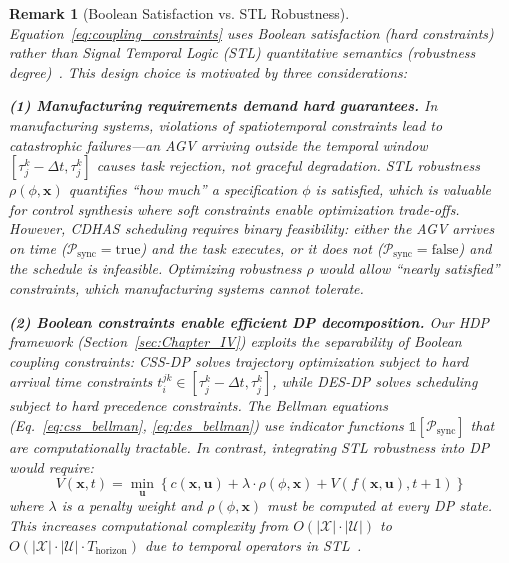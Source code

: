 \documentclass[manuscript,screen,review]{acmart}
\newtheorem{remark}{Remark}
\begin{document}
\begin{remark}[Boolean Satisfaction vs. STL Robustness]
\label{rem:stl_semantics}
Equation~\eqref{eq:coupling_constraints} uses \textit{Boolean satisfaction} 
(hard constraints) rather than Signal Temporal Logic (STL) \textit{quantitative 
semantics} (robustness degree)~\cite{melani2025tree}. 
This design choice is motivated by three considerations:

\textbf{(1) Manufacturing requirements demand hard guarantees.} In manufacturing 
systems, violations of spatiotemporal constraints lead to \textit{catastrophic 
failures}—an AGV arriving outside the temporal window $[\tau_j^k - \Delta t, \tau_j^k]$ 
causes task rejection, not graceful degradation. STL robustness $\rho(\phi, \mathbf{x})$ 
quantifies ``how much'' a specification $\phi$ is satisfied, 
which is valuable for control synthesis where soft constraints enable 
optimization trade-offs. However, CDHAS scheduling requires \textit{binary 
feasibility}: either the AGV arrives on time ($\mathcal{P}_{\text{sync}} = \text{true}$) 
and the task executes, or it does not ($\mathcal{P}_{\text{sync}} = \text{false}$) 
and the schedule is infeasible. Optimizing robustness $\rho$ would allow 
``nearly satisfied'' constraints, which manufacturing systems cannot tolerate.

\textbf{(2) Boolean constraints enable efficient DP decomposition.} Our HDP 
framework (Section~\ref{sec:Chapter_IV}) exploits the \textit{separability} of 
Boolean coupling constraints: CSS-DP solves trajectory optimization subject to 
hard arrival time constraints $t_i^{jk} \in [\tau_j^k - \Delta t, \tau_j^k]$, 
while DES-DP solves scheduling subject to hard precedence constraints. The 
Bellman equations (Eq.~\ref{eq:css_bellman}, \ref{eq:des_bellman}) use 
indicator functions $\mathbb{1}[\mathcal{P}_{\text{sync}}]$ that are 
computationally tractable. In contrast, integrating STL robustness into DP 
would require:
\begin{equation*}
V(\mathbf{x}, t) = \min_{\mathbf{u}} \left\{ c(\mathbf{x}, \mathbf{u}) + 
\lambda \cdot \rho(\phi, \mathbf{x}) + V(f(\mathbf{x}, \mathbf{u}), t+1) \right\}
\end{equation*}
where $\lambda$ is a penalty weight and $\rho(\phi, \mathbf{x})$ must be 
computed at every DP state. This increases computational complexity from 
$O(|\mathcal{X}| \cdot |\mathcal{U}|)$ to $O(|\mathcal{X}| \cdot |\mathcal{U}| 
\cdot T_{\text{horizon}})$ due to temporal operators in STL~\cite{melani2025tree}.


\end{remark}
\end{document}
